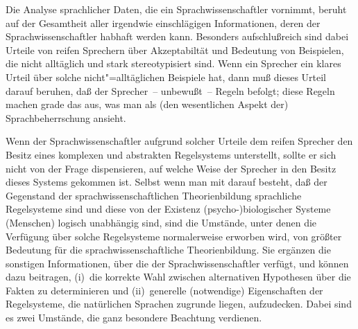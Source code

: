 \documentclass[output=paper]{langsci/langscibook}
\begin{document}
\ssubsection{}%
\label{subsec:1-7.2}
Die Analyse sprachlicher Daten, die ein Sprachwissenschaftler
vornimmt, beruht auf der Gesamtheit aller irgendwie einschlägigen
Informationen, deren der Sprachwissenschaftler habhaft werden
kann. Besonders aufschlußreich sind dabei Urteile von reifen Sprechern
über Akzeptabiltät und Bedeutung von Beispielen, die nicht alltäglich
und stark stereotypisiert sind. Wenn ein Sprecher ein klares Urteil
über solche nicht"=alltäglichen Beispiele hat, dann muß dieses Urteil
darauf beruhen, daß der Sprecher~-- unbewußt~-- Regeln befolgt; diese
Regeln machen grade das aus, was man als (den wesentlichen Aspekt der)
Sprachbeherrschung ansieht.

Wenn der Sprachwissenschaftler aufgrund solcher Urteile dem reifen
Sprecher den Besitz eines komplexen und abstrakten Regelsystems
unterstellt, sollte er sich nicht von der Frage dispensieren, auf
welche Weise der Sprecher in den Besitz dieses Systems gekommen
ist. Selbst wenn man mit \citet{Katz1981} darauf besteht, daß der
Gegenstand der sprachwissenschaftlichen Theorienbildung sprachliche
Regelsysteme sind und diese von der Existenz (psycho-)biologischer
Systeme (Menschen) logisch unabhängig sind, sind die Umstände, unter
denen die Verfügung über solche Regelsysteme normalerweise erworben
wird, von größter Bedeutung für die sprachwissenschaftliche
Theorienbildung. Sie ergänzen die sonstigen Informationen, über die
der Sprachwissenschaftler verfügt, und können dazu beitragen, (i)~die
korrekte Wahl zwischen alternativen Hypothesen über die Fakten zu
determinieren und (ii)~generelle (notwendige) Eigenschaften der
Regelsysteme, die natürlichen Sprachen zugrunde liegen,
aufzudecken. Dabei sind es zwei Umstände, die ganz besondere Beachtung
verdienen.

\ssubsubsection{}%
\label{subsubsec:1-7.2.1}
\end{document}
